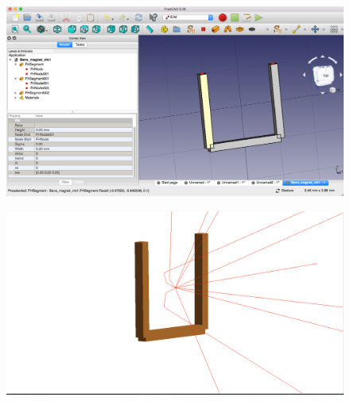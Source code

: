 \documentclass[12pt,a4paper]{article}
\begin{document}
\begin{figure}[h!]
\centering
\begin{minipage}{.5\textwidth}
  \centering
  \includegraphics[height=0.5\linewidth]{Images//CAD_Mag//maginfreeCAD.png}
  \label{freee}
\end{minipage}%
\begin{minipage}{.5\textwidth}
  \centering
  \includegraphics[height=.5\linewidth]{Images//CAD_Mag//maginbdsim.png}
  \label{repel}
\end{minipage}%
\end{figure}
\end{document}
